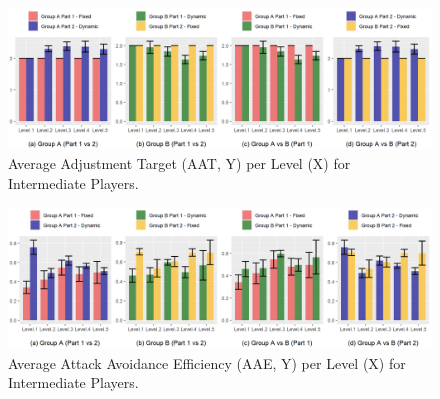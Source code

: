 

\begin{figure}[!ht]
    \caption{Average Adjustment Target (AAT, Y) per Level (X) for Intermediate Players.}
    \begin{center}
        \includegraphics[width=34em]{figures/adjustment_target_level-intermediate_players.png}
    \end{center}
    \label{fig:result-metric-intermediate-adjustment-target-level}
\end{figure}

\begin{figure}[!ht]
    \caption{Average Attack Avoidance Efficiency (AAE, Y) per Level (X) for Intermediate Players.}
    \begin{center}
        \includegraphics[width=34em]{figures/attack_avoidance_efficiency-intermediate_players.png}
    \end{center}
    \label{fig:result-metric-intermediates-attack-avoidance-efficiency}
\end{figure}

